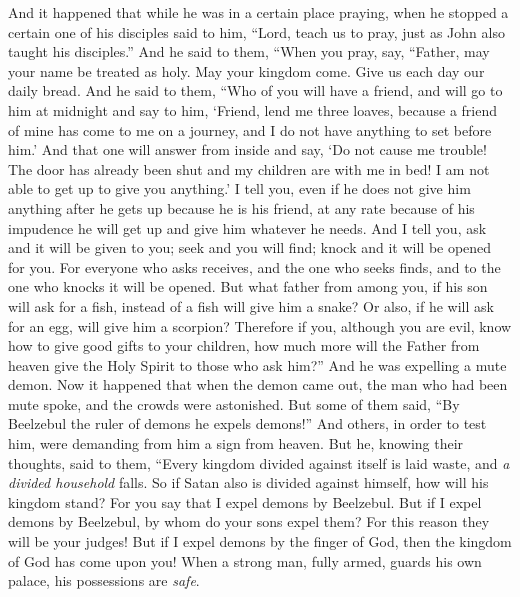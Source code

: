 \begin{biblechapter} %
 And it happened that while he was in a certain place praying, when he stopped a certain one of his disciples said to him, “Lord, teach us to pray, just as John also taught his disciples.”
\verse And he said to them, “When you pray, say,
\verse “Father, 
may your name be treated as holy. 
May your kingdom come.
\verse Give us each day our daily bread.
 And he said to them, “Who of you will have a friend, and will go to him at midnight and say to him, ‘Friend, lend me three loaves,
\verse because a friend of mine has come to me on a journey, and I do not have anything to set before him.’
\verse And that one will answer from inside and say, ‘Do not cause me trouble! The door has already been shut and my children are with me in bed! I am not able to get up to give you anything.’
\verse I tell you, even if he does not give him anything after he gets up because he is his friend, at any rate because of his impudence he will get up and give him whatever he needs.
\verse And I tell you, ask and it will be given to you; seek and you will find; knock and it will be opened for you.
\verse For everyone who asks receives, and the one who seeks finds, and to the one who knocks it will be opened.
\verse But what father from among you, if his son will ask for a fish, instead of a fish will give him a snake?
\verse Or also, if he will ask for an egg, will give him a scorpion?
\verse Therefore if you, although you are evil, know how to give good gifts to your children, how much more will the Father from heaven give the Holy Spirit to those who ask him?”
 And he was expelling a mute demon. Now it happened that when the demon came out, the man who had been mute spoke, and the crowds were astonished.
\verse But some of them said, “By Beelzebul the ruler of demons he expels demons!”
\verse And others, in order to test him, were demanding from him a sign from heaven.
\verse But he, knowing their thoughts, said to them, “Every kingdom divided against itself is laid waste, and \textit{a divided household} falls.
\verse So if Satan also is divided against himself, how will his kingdom stand? For you say that I expel demons by Beelzebul.
\verse But if I expel demons by Beelzebul, by whom do your sons expel them? For this reason they will be your judges!
\verse But if I expel demons by the finger of God, then the kingdom of God has come upon you!
\verse When a strong man, fully armed, guards his own palace, his possessions are \textit{safe}.

\end{biblechapter}

